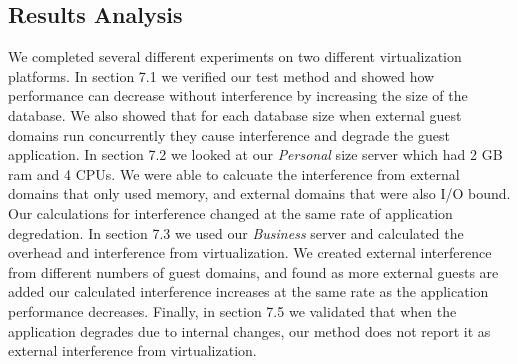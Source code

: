 \subsection{Results Analysis}
We completed several different experiments on two different virtualization platforms.  In section 7.1 we verified our test method and showed how performance can decrease without interference by increasing the size of the database.  We also showed that for each database size when external guest domains run concurrently they cause interference and degrade the guest application.  In section 7.2 we looked at our \emph{Personal} size server which had 2 GB ram and 4 CPUs.  We were able to calcuate the interference from external domains that only used memory, and external domains that were also I/O bound.  Our calculations for interference changed at the same rate of application degredation.  In section 7.3 we used our \emph{Business} server and calculated the overhead and interference from virtualization.  We created external interference from different numbers of guest domains, and found as more external guests are added our calculated interference increases at the same rate as the application performance decreases.  Finally, in section 7.5 we validated that when the application degrades due to internal changes, our method does not report it as external interference from virtualization.

